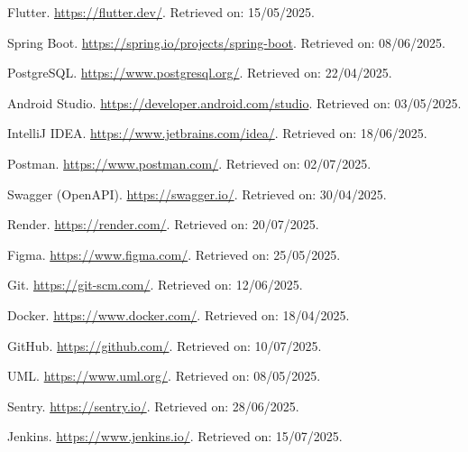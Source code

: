 \adjustmtc
\renewcommand\bibname{Webliography}
\begin{thebibliography}{}

Flutter. \url{https://flutter.dev/}. Retrieved on: 15/05/2025.

Spring Boot. \url{https://spring.io/projects/spring-boot}. Retrieved on: 08/06/2025.

PostgreSQL. \url{https://www.postgresql.org/}. Retrieved on: 22/04/2025.

Android Studio. \url{https://developer.android.com/studio}. Retrieved on: 03/05/2025.

IntelliJ IDEA. \url{https://www.jetbrains.com/idea/}. Retrieved on: 18/06/2025.

Postman. \url{https://www.postman.com/}. Retrieved on: 02/07/2025.

Swagger (OpenAPI). \url{https://swagger.io/}. Retrieved on: 30/04/2025.

Render. \url{https://render.com/}. Retrieved on: 20/07/2025.

Figma. \url{https://www.figma.com/}. Retrieved on: 25/05/2025.

Git. \url{https://git-scm.com/}. Retrieved on: 12/06/2025.

Docker. \url{https://www.docker.com/}. Retrieved on: 18/04/2025.

GitHub. \url{https://github.com/}. Retrieved on: 10/07/2025.

UML. \url{https://www.uml.org/}. Retrieved on: 08/05/2025.

Sentry. \url{https://sentry.io/}. Retrieved on: 28/06/2025.

Jenkins. \url{https://www.jenkins.io/}. Retrieved on: 15/07/2025.

\end{thebibliography}
